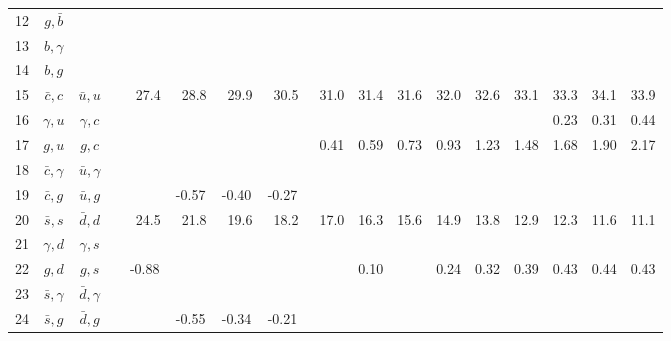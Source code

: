 \begin{tabular}{rccc@{}S@{}S@{}S@{}S@{}S@{}S@{}S@{}S@{}S@{}S@{}S@{}S@{}S}
  12 & $g,\bar b$       &                  &                 &       &       &       &       &       &      &      &      &      &      &      &      &      \\
  13 & $b,\gamma$       &                  &                 &       &       &       &       &       &      &      &      &      &      &      &      &      \\
  14 & $b,g$            &                  &                 &       &       &       &       &       &      &      &      &      &      &      &      &      \\
  15 & $\bar c,c$       & $\bar u,u$       &                 &\ 27.4 &\ 28.8 &\ 29.9 &\ 30.5 &\ 31.0 & 31.4 & 31.6 & 32.0 & 32.6 & 33.1 & 33.3 & 34.1 & 33.9 \\
  16 & $\gamma, u$      & $\gamma, c$      &                 &       &       &       &       &       &      &      &      &      &      & 0.23 & 0.31 & 0.44 \\
  17 & $g,u$            & $g,c$            &                 &       &       &       &       &\ 0.41 & 0.59 & 0.73 & 0.93 & 1.23 & 1.48 & 1.68 & 1.90 & 2.17 \\
  18 & $\bar c,\gamma$  & $\bar u,\gamma$  &                 &       &       &       &       &       &      &      &      &      &      &      &      &      \\
  19 & $\bar c, g$      & $\bar u, g$      &                 &       &-0.57  & -0.40 & -0.27 &       &      &      &      &      &      &      &      &      \\
  20 & $\bar s, s$      & $\bar d, d$      &                 &\ 24.5 &\ 21.8 &\ 19.6 &\ 18.2 &\ 17.0 & 16.3 & 15.6 & 14.9 & 13.8 & 12.9 & 12.3 & 11.6 & 11.1 \\
  21 & $\gamma, d$      & $\gamma, s$      &                 &       &       &       &       &       &      &      &      &      &      &      &      &      \\
  22 & $g,d$            & $g,s$            &                 & -0.88 &       &       &       &       & 0.10 &      & 0.24 & 0.32 & 0.39 & 0.43 & 0.44 & 0.43 \\
  23 & $\bar s,\gamma$  & $\bar d,\gamma$  &                 &       &       &       &       &       &      &      &      &      &      &      &      &      \\
  24 & $\bar s,g$       & $\bar d, g$      &                 &       &-0.55  & -0.34 & -0.21 &       &      &      &      &      &      &      &      &      \\

\end{tabular}
